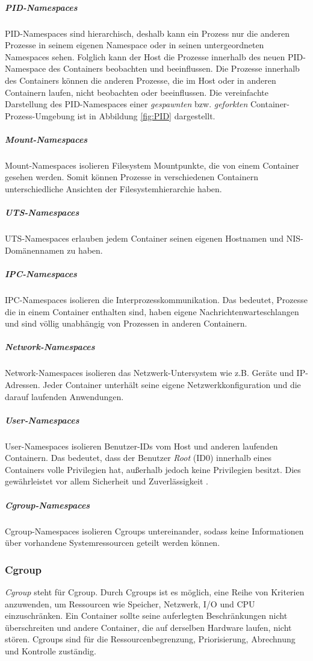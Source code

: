 \subparagraph{PID-Namespaces} PID-Namespaces sind hierarchisch, deshalb kann ein Prozess nur die anderen Prozesse in seinem eigenen Namespace oder in seinen untergeordneten Namespaces sehen. Folglich kann der Host die Prozesse innerhalb des neuen PID-Namespace des Containers beobachten und beeinflussen. Die Prozesse innerhalb des Containers können die anderen Prozesse, die im Host oder in anderen Containern laufen, nicht beobachten oder beeinflussen. Die vereinfachte Darstellung des PID-Namespaces einer \emph{gespawnten} bzw. \emph{geforkten} Container-Prozess-Umgebung ist in Abbildung \ref{fig:PID} dargestellt. \cite{Liebel2017SkalierbareContainer-Infrastrukturen}

\subparagraph{Mount-Namespaces} Mount-Namespaces isolieren Filesystem Mountpunkte, die von einem Container gesehen werden. Somit können Prozesse in verschiedenen Containern unterschiedliche Ansichten der Filesystemhierarchie haben.

\subparagraph{UTS-Namespaces} UTS-Namespaces erlauben jedem Container seinen eigenen Hostnamen und \ac{NIS}-Domänennamen zu haben.

\subparagraph{IPC-Namespaces} IPC-Namespaces isolieren die Interprozesskommunikation. Das bedeutet, Prozesse die in einem Container enthalten sind, haben eigene Nachrichtenwarteschlangen und sind völlig unabhängig von Prozessen in anderen Containern.

\subparagraph{Network-Namespaces} Network-Namespaces isolieren das Netzwerk-Untersystem wie z.B. Geräte und IP-Adressen. Jeder Container unterhält seine eigene Netzwerkkonfiguration und die darauf laufenden Anwendungen.

\subparagraph{User-Namespaces} User-Namespaces isolieren Benutzer-IDs vom Host und anderen laufenden Containern. Das bedeutet, dass der Benutzer \emph{Root} (ID0) innerhalb eines Containers volle Privilegien hat, außerhalb jedoch keine Privilegien besitzt. Dies gewährleistet vor allem Sicherheit und Zuverlässigkeit \cite{Xavier2015AClouds}.

\subparagraph{Cgroup-Namespaces} Cgroup-Namespaces isolieren Cgroups untereinander, sodass keine Informationen über vorhandene Systemressourcen geteilt werden können.



\subsubsection{Cgroup}
\emph{Cgroup} steht für \ac{Cgroup}. Durch Cgroups ist es möglich, eine Reihe von Kriterien anzuwenden, um Ressourcen wie Speicher, Netzwerk, I/O und CPU einzuschränken. Ein Container sollte seine auferlegten Beschränkungen nicht überschreiten und andere Container, die auf derselben Hardware laufen, nicht stören. Cgroups sind für die Ressourcenbegrenzung, Priorisierung, Abrechnung und Kontrolle zuständig.

